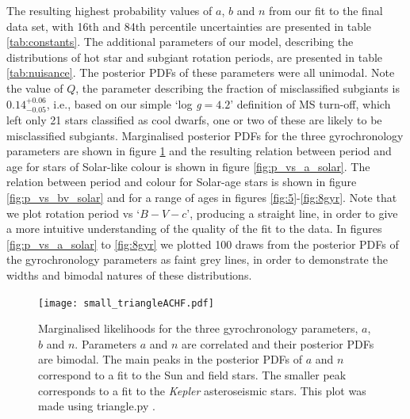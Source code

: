 \documentclass[useAMS, usenatbib]{mn2e}
\newcommand{\logg}{log \emph{g}}
\newcommand{\Q}{0.14}
\newcommand{\Qerrp}{0.06}
\newcommand{\Qerrm}{0.05}
\begin{document}
The resulting highest probability values of $a$, $b$ and $n$ from our fit to
the final data set, with 16th and 84th percentile uncertainties are
presented in table \ref{tab:constants}.
The additional parameters of our model, describing the distributions of hot
star and subgiant rotation periods, are presented in table \ref{tab:nuisance}.
The posterior PDFs of these parameters were all unimodal.
Note the value of $Q$, the parameter describing the fraction of misclassified
subgiants is $\Q^{+\Qerrp}_{-\Qerrm}$, i.e., based on our simple `\logg$=4.2$'
definition of MS turn-off, which left only 21 stars classified as cool dwarfs,
one or two of these are likely to be misclassified subgiants.
Marginalised posterior PDFs for the three gyrochronology parameters are shown
in figure \ref{fig:triangle} and the resulting relation between period and age
for stars of Solar-like colour is shown in figure \ref{fig:p_vs_a_solar}.
The relation between period and colour for Solar-age stars is shown in figure
\ref{fig:p_vs_bv_solar} and for a range of ages in figures
\ref{fig:5}-\ref{fig:8gyr}.
Note that we plot rotation period vs `$B-V-c$', producing a straight line, in
order to give a more intuitive understanding of the quality of the fit to the
data.
In figures \ref{fig:p_vs_a_solar} to \ref{fig:8gyr} we plotted 100 draws from
the posterior PDFs of the gyrochronology parameters as faint grey lines,
in order to demonstrate the widths and bimodal natures of these distributions.

\begin{figure}
\begin{center}
\texttt{[image: small\_triangleACHF.pdf]}
\caption{Marginalised likelihoods for the three gyrochronology
parameters, $a$, $b$ and $n$. Parameters $a$ and $n$ are correlated and their
posterior PDFs are bimodal. The main peaks in the posterior PDFs of $a$ and
$n$ correspond to a fit to the Sun and field stars. The smaller peak
corresponds to a fit to the {\it Kepler} asteroseismic stars.
This plot was made using triangle.py
\citep{Foreman-Mackey_triangle}.
\label{fig:triangle}}
\end{center}
\end{figure}
\end{document}
